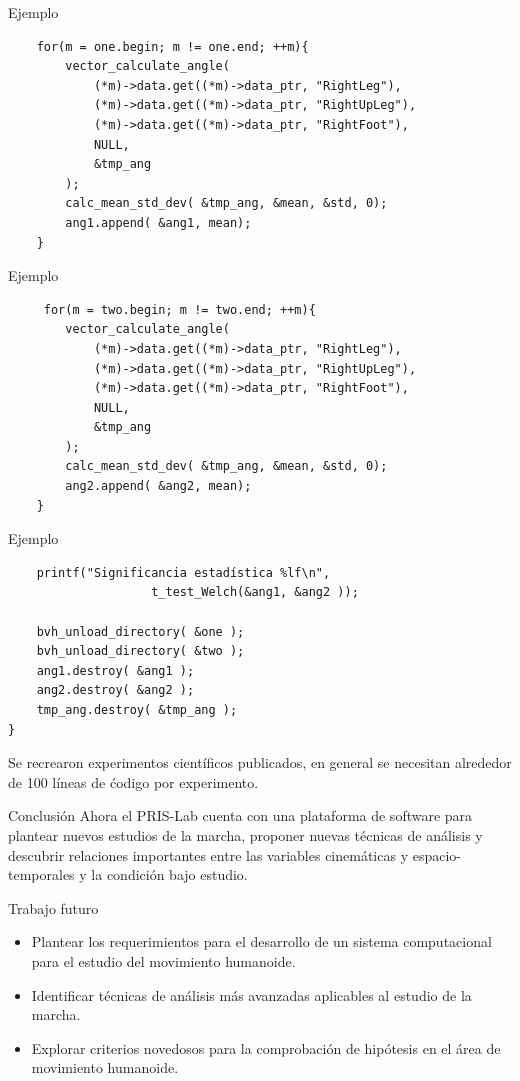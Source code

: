 \documentclass[aspectratio=169,spanish]{beamer} %
\begin{document}
\begin{frame}[fragile]{Ejemplo}
    \begin{verbatim}
    for(m = one.begin; m != one.end; ++m){
        vector_calculate_angle( 
            (*m)->data.get((*m)->data_ptr, "RightLeg"), 
            (*m)->data.get((*m)->data_ptr, "RightUpLeg"),
            (*m)->data.get((*m)->data_ptr, "RightFoot"),
            NULL,
            &tmp_ang
        );
        calc_mean_std_dev( &tmp_ang, &mean, &std, 0);
        ang1.append( &ang1, mean);
    }
\end{verbatim}
\end{frame}

\begin{frame}[fragile]{Ejemplo}
\begin{verbatim}
     for(m = two.begin; m != two.end; ++m){
        vector_calculate_angle( 
            (*m)->data.get((*m)->data_ptr, "RightLeg"), 
            (*m)->data.get((*m)->data_ptr, "RightUpLeg"),
            (*m)->data.get((*m)->data_ptr, "RightFoot"),
            NULL,
            &tmp_ang
        );
        calc_mean_std_dev( &tmp_ang, &mean, &std, 0);
        ang2.append( &ang2, mean);
    }
\end{verbatim}
\end{frame}

\begin{frame}[fragile]{Ejemplo}
\begin{verbatim}
    printf("Significancia estadística %lf\n", 
                    t_test_Welch(&ang1, &ang2 ));

    bvh_unload_directory( &one );
    bvh_unload_directory( &two );
    ang1.destroy( &ang1 );
    ang2.destroy( &ang2 );
    tmp_ang.destroy( &tmp_ang );
}
\end{verbatim}
\begin{block}{}
    Se recrearon experimentos científicos publicados, en general se necesitan alrededor de 100 líneas de ćodigo por experimento. 
\end{block}
\end{frame}

\begin{frame}{Conclusión}
    Ahora el PRIS-Lab cuenta con una plataforma de software para plantear nuevos estudios de la marcha, proponer nuevas técnicas de análisis y descubrir relaciones importantes entre las variables cinemáticas y espacio-temporales y la condición bajo estudio.  
\end{frame}

\begin{frame}{Trabajo futuro}
    \begin{itemize}
        \item Plantear los requerimientos para el desarrollo de un sistema computacional para el estudio del movimiento humanoide. 
        \item Identificar técnicas de análisis más avanzadas aplicables al estudio de la marcha. 
        \item Explorar criterios novedosos para la comprobación de hipótesis en el área de movimiento humanoide. 
    \end{itemize}
\end{frame}
\end{document}
